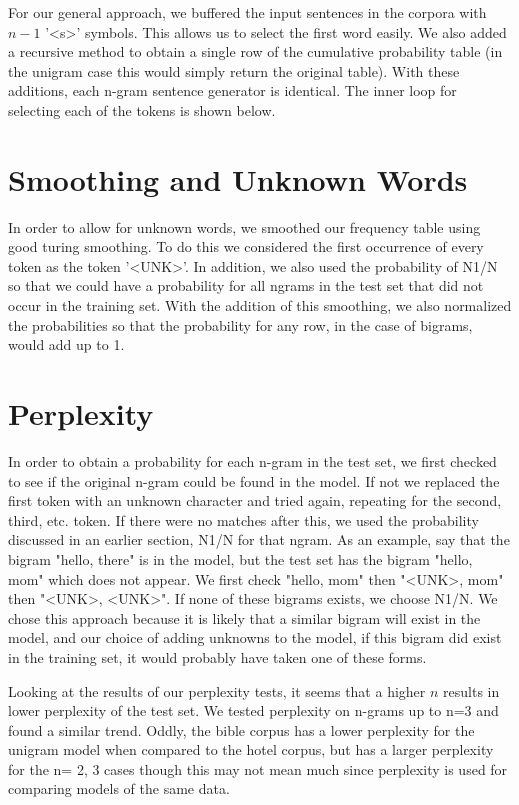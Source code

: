 \documentclass[11pt]{article}
\begin{document}
For our general approach, we buffered the input sentences in the corpora with $n-1$ '<s>' symbols. This allows us to select the first word easily. We also added a recursive method to obtain a single row of the cumulative probability table (in the unigram case this would simply return the original table). With these additions, each n-gram sentence generator is identical. The inner loop for selecting each of the tokens is shown below.

\section{Smoothing and Unknown Words}
In order to allow for unknown words, we smoothed our frequency table using good turing smoothing. To do this we considered the first occurrence of every token as the token '<UNK>'. In addition, we also used the probability of N1/N so that we could have a probability for all ngrams in the test set that did not occur in the training set. With the addition of this smoothing, we also normalized the probabilities so that the probability for any row, in the case of bigrams, would add up to 1.

\section{Perplexity}
In order to obtain a probability for each n-gram in the test set, we first checked to see if the original n-gram could be found in the model. If not we replaced the first token with an unknown character and tried again, repeating for the second, third, etc. token. If there were no matches after this, we used the probability discussed in an earlier section, N1/N for that ngram. As an example, say that the bigram "hello, there" is in the model, but the test set has the bigram "hello, mom" which does not appear. We first check "hello, mom" then "<UNK>, mom" then "<UNK>, <UNK>". If none of these bigrams exists, we choose N1/N. We chose this approach because it is likely that a similar bigram will exist in the model, and our choice of adding unknowns to the model, if this bigram did exist in the training set, it would probably have taken one of these forms.

Looking at the results of our perplexity tests, it seems that a higher $n$ results in lower perplexity of the test set. We tested perplexity on n-grams up to n=3 and found a similar trend. Oddly, the bible corpus has a lower perplexity for the unigram model when compared to the hotel corpus, but has a larger perplexity for the n= 2, 3 cases though this may not mean much since perplexity is used for comparing models of the same data. 
\end{document}
